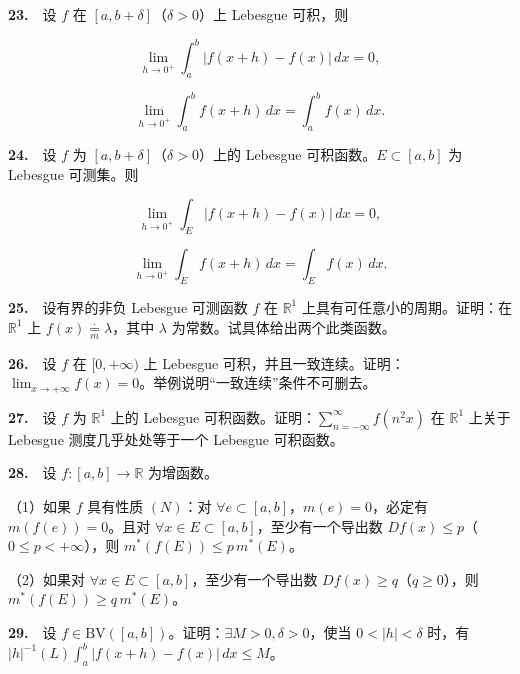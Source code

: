 \documentclass[11pt,a4paper]{article}
\begin{document}
\par{}\hypertarget{review23}{}\noindent \textbf{23.}　设 \(f\) 在 \([a,b+\delta]\)（\(\delta>0\)）上 Lebesgue 可积，则

\[
\lim_{h\to0^+}\int_a^b|f(x+h)-f(x)|\,dx=0,
\]

\[
\lim_{h\to0^+}\int_a^b f(x+h)\,dx=\int_a^b f(x)\,dx.
\]

\par{}\hypertarget{review24}{}\noindent \textbf{24.}　设 \(f\) 为 \([a,b+\delta]\)（\(\delta>0\)）上的 Lebesgue 可积函数。\(E\subset[a,b]\) 为 Lebesgue 可测集。则

\[
\lim_{h\to0^+}\int_E|f(x+h)-f(x)|\,dx=0,
\]

\[
\lim_{h\to0^+}\int_E f(x+h)\,dx=\int_E f(x)\,dx.
\]

\par{}\hypertarget{review25}{}\noindent \textbf{25.}　设有界的非负 Lebesgue 可测函数 \(f\) 在 \(\mathbb R^1\) 上具有可任意小的周期。证明：在 \(\mathbb R^1\) 上 \(f(x)\underset{m}{\overset{\cdot}{=}}\lambda\)，其中 \(\lambda\) 为常数。试具体给出两个此类函数。

\par{}\hypertarget{review26}{}\noindent \textbf{26.}　设 \(f\) 在 \([0,+\infty)\) 上 Lebesgue 可积，并且一致连续。证明：\(\lim_{x\to+\infty}f(x)=0\)。举例说明``一致连续''条件不可删去。

\par{}\hypertarget{review27}{}\noindent \textbf{27.}　设 \(f\) 为 \(\mathbb R^1\) 上的 Lebesgue 可积函数。证明：\(\sum_{n=-\infty}^{\infty}f(n^2x)\) 在 \(\mathbb R^1\) 上关于 Lebesgue 测度几乎处处等于一个 Lebesgue 可积函数。

\par{}\hypertarget{review28}{}\noindent \textbf{28.}　设 \(f:[a,b]\to\mathbb R\) 为增函数。

（1）如果 \(f\) 具有性质 \((N)\)：对 \(\forall e\subset[a,b]\)，\(m(e)=0\)，必定有 \(m(f(e))=0\)。且对 \(\forall x\in E\subset[a,b]\)，至少有一个导出数 \(Df(x)\le p\)（\(0\le p<+\infty\)），则 \(m^*(f(E))\le p\,m^*(E)\)。

（2）如果对 \(\forall x\in E\subset[a,b]\)，至少有一个导出数 \(Df(x)\ge q\)（\(q\ge0\)），则 \(m^*(f(E))\ge q\,m^*(E)\)。

\par{}\hypertarget{review29}{}\noindent \textbf{29.}　设 \(f\in\mathrm{BV}([a,b])\)。证明：\(\exists M>0,\delta>0\)，使当 \(0<|h|<\delta\) 时，有 \(|h|^{-1}(L)\int_a^b|f(x+h)-f(x)|\,dx\le M\)。
\end{document}

